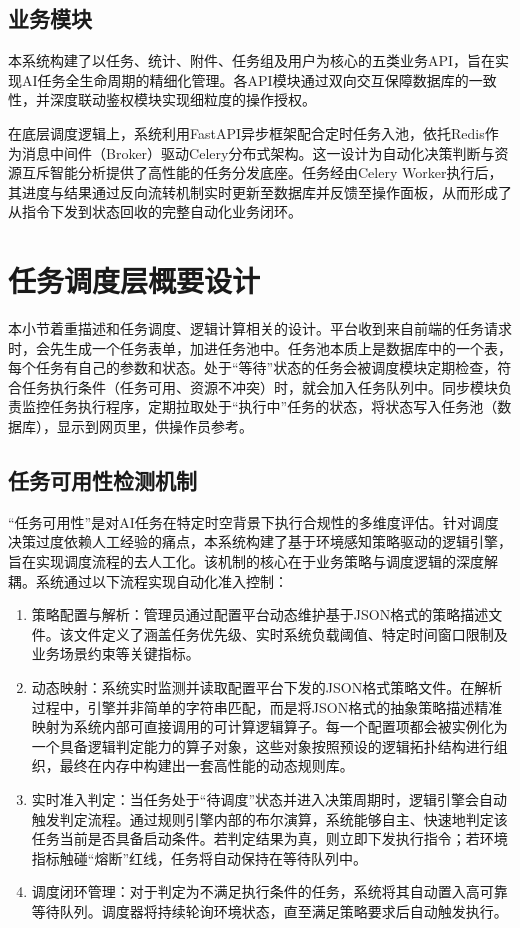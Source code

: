 \subsection{业务模块}

本系统构建了以任务、统计、附件、任务组及用户为核心的五类业务API，旨在实现AI任务全生命周期的精细化管理。各API模块通过双向交互保障数据库的一致性，并深度联动鉴权模块实现细粒度的操作授权。

在底层调度逻辑上，系统利用FastAPI异步框架配合定时任务入池，依托Redis作为消息中间件（Broker）驱动Celery分布式架构。这一设计为自动化决策判断与资源互斥智能分析提供了高性能的任务分发底座。任务经由Celery Worker执行后，其进度与结果通过反向流转机制实时更新至数据库并反馈至操作面板，从而形成了从指令下发到状态回收的完整自动化业务闭环。

\section{任务调度层概要设计}

本小节着重描述和任务调度、逻辑计算相关的设计。平台收到来自前端的任务请求时，会先生成一个任务表单，加进任务池中。任务池本质上是数据库中的一个表，每个任务有自己的参数和状态。处于“等待”状态的任务会被调度模块定期检查，符合任务执行条件（任务可用、资源不冲突）时，就会加入任务队列中。同步模块负责监控任务执行程序，定期拉取处于“执行中”任务的状态，将状态写入任务池（数据库），显示到网页里，供操作员参考。

\subsection{任务可用性检测机制}

“任务可用性”是对AI任务在特定时空背景下执行合规性的多维度评估。针对调度决策过度依赖人工经验的痛点，本系统构建了基于环境感知策略驱动的逻辑引擎，旨在实现调度流程的去人工化。该机制的核心在于业务策略与调度逻辑的深度解耦。系统通过以下流程实现自动化准入控制：

\begin{enumerate}
    \item 策略配置与解析：管理员通过配置平台动态维护基于JSON格式的策略描述文件。该文件定义了涵盖任务优先级、实时系统负载阈值、特定时间窗口限制及业务场景约束等关键指标。
    \item 动态映射：系统实时监测并读取配置平台下发的JSON格式策略文件。在解析过程中，引擎并非简单的字符串匹配，而是将JSON格式的抽象策略描述精准映射为系统内部可直接调用的可计算逻辑算子。每一个配置项都会被实例化为一个具备逻辑判定能力的算子对象，这些对象按照预设的逻辑拓扑结构进行组织，最终在内存中构建出一套高性能的动态规则库。
    \item 实时准入判定：当任务处于“待调度”状态并进入决策周期时，逻辑引擎会自动触发判定流程。通过规则引擎内部的布尔演算，系统能够自主、快速地判定该任务当前是否具备启动条件。若判定结果为真，则立即下发执行指令；若环境指标触碰“熔断”红线，任务将自动保持在等待队列中。
    \item 调度闭环管理：对于判定为不满足执行条件的任务，系统将其自动置入高可靠等待队列。调度器将持续轮询环境状态，直至满足策略要求后自动触发执行。
\end{enumerate}

